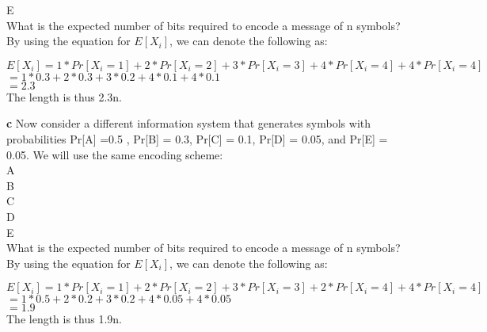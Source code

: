 \documentclass[12pt]{article}
\begin{document}
E  \\
What is the expected number of bits required to encode a message of n symbols? \\
\linebreak
By using the equation for $E[X_i]$, we can denote the following as: \\
\begin{center}
$E[X_i] = 1 *Pr[X_i=1] + 2 * Pr[X_i=2] + 3 * Pr[X_i=3] + 4 * Pr[X_i=4] + 4 * Pr[X_i=4]  $ \\
$ = 1 * 0.3 + 2 * 0.3 + 3 * 0.2 + 4 * 0.1 + 4 * 0.1$ \\
$= 2.3$ \\
The length is thus 2.3n. \\
\end{center}
\linebreak
\textbf{c} Now consider a different information system that generates symbols with probabilities Pr[A] =0.5 , Pr[B] = 0.3, Pr[C] = 0.1, Pr[D] = 0.05, and Pr[E] = 0.05. We will use the same encoding scheme: \\
A  \\
B  \\
C  \\
D  \\
E  \\
What is the expected number of bits required to encode a message of n symbols? \\
\linebreak
By using the equation for $E[X_i]$, we can denote the following as: \\
\begin{center}
$E[X_i] = 1 *Pr[X_i=1] + 2 * Pr[X_i=2] + 3 * Pr[X_i=3] + 2 * Pr[X_i=4] + 4 * Pr[X_i=4]  $ \\
$ = 1 * 0.5 + 2 * 0.2 + 3 * 0.2 + 4 * 0.05 + 4 * 0.05$ \\
$= 1.9$ \\
The length is thus 1.9n. \\
\end{center}
\linebreak
\end{document}
